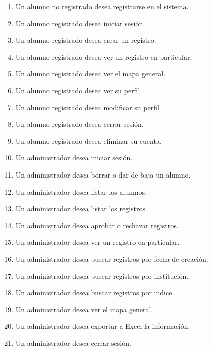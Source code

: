 \begin{enumerate}
    \itemsep-1em
    \item Un alumno no registrado desea registrarse en el sistema.
    \item Un alumno registrado desea iniciar sesión.
    \item Un alumno registrado desea crear un registro.
    \item Un alumno registrado desea ver un registro en particular.
    \item Un alumno registrado desea ver el mapa general.
    \item Un alumno registrado desea ver su perfil.
    \item Un alumno registrado desea modificar su perfil.
    \item Un alumno registrado desea cerrar sesión.
    \item Un alumno registrado desea eliminar su cuenta.
    \item Un administrador desea iniciar sesión.
    \item Un administrador desea borrar o dar de baja un alumno.
    \item Un administrador desea listar los alumnos.
    \item Un administrador desea listar los registros.
    \item Un administrador desea aprobar o rechazar registros.
    \item Un administrador desea ver un registro en particular.
    \item Un administrador desea buscar registros por fecha de creación.
    \item Un administrador desea buscar registros por institución.
    \item Un administrador desea buscar registros por indice.
    \item Un administrador desea ver el mapa general.
    \item Un administrador desea exportar a Excel la información.
    \item Un administrador desea cerrar sesión.


\end{enumerate}